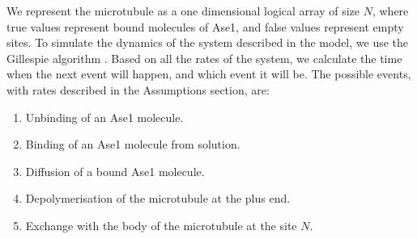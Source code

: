 \documentclass{article}
\begin{document}
We represent the microtubule as a one dimensional logical array of size $N$, where true values represent bound molecules of Ase1, and false values represent empty sites. To simulate the dynamics of the system described in the model, we use the Gillespie algorithm \cite{Gillespie1976}. Based on all the rates of the system, we calculate the time when the next event will happen, and which event it will be. The possible events, with rates described in the Assumptions section, are:
\begin{enumerate}
	\item Unbinding of an Ase1 molecule.
	\item Binding of an Ase1 molecule from solution.
	\item Diffusion of a bound Ase1 molecule.
	\item Depolymerisation of the microtubule at the plus end.
	\item Exchange with the body of the microtubule at the site $N$.
\end{enumerate}

\small


\end{document}
